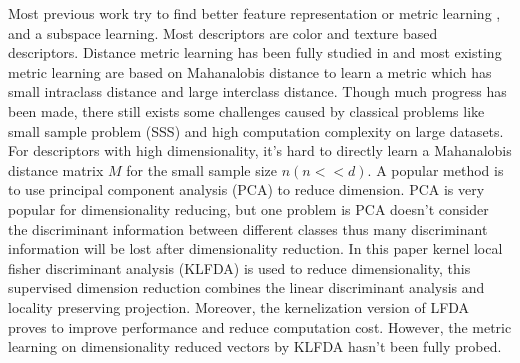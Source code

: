 \documentclass[conference,compsoc]{IEEEtran}
\begin{document}
Most previous work try to find better feature representation \cite{LOMO, GOG, RegionCovariance, SDALF} or metric learning \cite{KISSME, LFDA, PCCA, TDL, PRDC, LMNN, KLFDA, KCCA, KernelVersionMetrics, NFST, ITML}, and a subspace learning. Most descriptors are color and texture based descriptors. Distance metric learning has been fully studied in \cite{MetricSurvey} and most existing metric learning are based on Mahanalobis distance to learn a metric which has small intraclass distance and large interclass distance. Though much progress has been made, there still exists some challenges caused by classical problems like small sample problem (SSS) and high computation complexity on large datasets. \\
\indent For descriptors with high dimensionality, it's hard to directly learn a Mahanalobis distance matrix $M$ for the small sample size $n (n<<d)$. A popular method is to use principal component analysis (PCA) to reduce dimension. PCA is very popular for dimensionality reducing, but one problem is  PCA doesn't consider the discriminant information between different classes thus many discriminant information will be lost after dimensionality reduction. In this paper kernel local fisher discriminant analysis (KLFDA) \cite{KLFDA} is used to reduce dimensionality, this supervised dimension reduction combines the linear discriminant analysis and locality preserving projection. Moreover, the kernelization version of LFDA proves to improve performance and reduce computation cost. However, the metric learning on dimensionality reduced vectors by KLFDA hasn't been fully probed.\\
\end{document}
